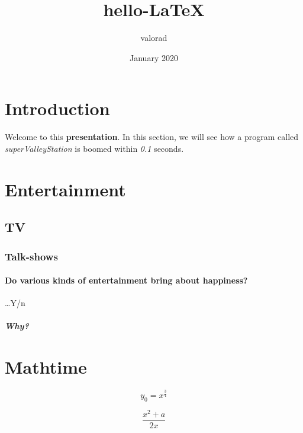 \documentclass{article}
\title{hello-\LaTeX}
\author{valorad }
\date{January 2020}
\begin{document}
\maketitle

\tableofcontents

\newpage

\section{Introduction}
Welcome to this \textbf{presentation}. In this section, we will see how a program called \textit{superValleyStation} is boomed within \emph{0.1} seconds.

\section{Entertainment}

\subsection{TV}

\subsubsection{Talk-shows}


\paragraph{
Do various kinds of entertainment bring about happiness?
}

\ldots Y/n

\subparagraph{Why?}





\section{Mathtime}

\begin{equation}
    y_0 = x^{ \frac{3} {4} }
\end{equation}

\begin{equation}
   \frac {x^2 + a} {2x}
\end{equation}
\end{document}
